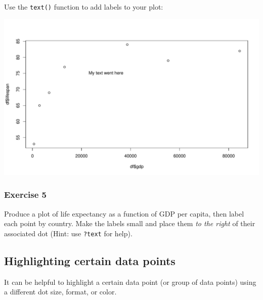 \documentclass[
]{book}
\newenvironment{Shaded}{\begin{snugshade}}{\end{snugshade}}
\newcommand{\DataTypeTok}[1]{\textcolor[rgb]{0.13,0.29,0.53}{#1}}
\newcommand{\DecValTok}[1]{\textcolor[rgb]{0.00,0.00,0.81}{#1}}
\newcommand{\KeywordTok}[1]{\textcolor[rgb]{0.13,0.29,0.53}{\textbf{#1}}}
\newcommand{\NormalTok}[1]{#1}
\newcommand{\OperatorTok}[1]{\textcolor[rgb]{0.81,0.36,0.00}{\textbf{#1}}}
\newcommand{\StringTok}[1]{\textcolor[rgb]{0.31,0.60,0.02}{#1}}
\begin{document}
Use the \texttt{text()} function to add labels to your plot:

\begin{Shaded}
\end{Shaded}

\includegraphics{figures/unnamed-chunk-122-1.pdf}

\hypertarget{exercise-5-1}{%
\subsubsection*{Exercise 5}\label{exercise-5-1}}

Produce a plot of life expectancy as a function of GDP per capita, then label each point by country. Make the labels small and place them \emph{to the right} of their associated dot (Hint: use \texttt{?text} for help).

\hypertarget{highlighting-certain-data-points}{%
\subsection*{Highlighting certain data points}\label{highlighting-certain-data-points}}

It can be helpful to highlight a certain data point (or group of data points) using a different dot size, format, or color.
\end{document}
